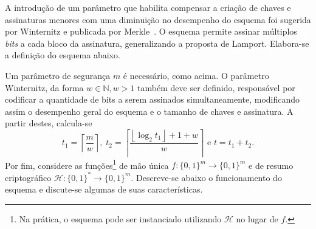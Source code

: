 \documentclass[12pt]{report}
\newcommand{\hh}{$\mathcal{H}$}
\newcommand{\binwds}[1]{\{0, 1\}^{#1}}
\begin{document}
A introdução de um parâmetro que habilita compensar a criação de chaves e
assinaturas menores com uma diminuição no desempenho do esquema foi sugerida
por Winternitz e publicada por Merkle~\cite{Merkle:1989:CDS:118209.118230}.
O esquema permite assinar múltiplos \emph{bits} a cada bloco da assinatura,
generalizando a proposta de Lamport. Elabora-se a definição do esquema abaixo.

Um parâmetro de segurança $m$ é necessário, como acima. O parâmetro
Winternitz, da forma $w \in \mathbb{N}, w > 1$ também deve ser definido, responsável por codificar a
quantidade de bits a serem assinados simultaneamente, modificando assim o
desempenho geral do esquema e o tamanho de chaves e assinatura. A partir destes,
calcula-se
    $$t_1 = \left\lceil \frac{m}{w} \right\rceil, \; t_2 = \left\lceil 
    \frac{\left\lfloor \log_2 t_1 \right\rfloor + 1 + w}{w} \right\rceil \text{ e }
    t = t_1 + t_2.$$
Por fim, considere as funções\footnote{Na prática, o esquema pode ser instanciado utilizando \hh{} no lugar de $f$.} de mão única
$f : \binwds{m} \longrightarrow \binwds{m}$
e de resumo criptográfico
$\mathcal{H} : \binwds{*} \longrightarrow \binwds{m}$.
Descreve-se abaixo o funcionamento do esquema
e discute-se algumas de suas características. 
\end{document}

